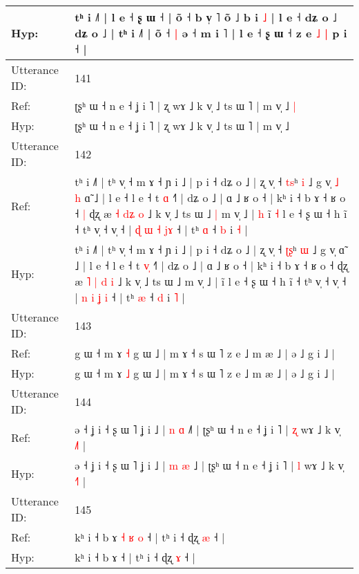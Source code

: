 \documentclass[10pt]{article}
\DeclareRobustCommand{\hl}[1]{{\textcolor{red}{#1}}}
\begin{document}
\begin{longtable}{ll}
 \\
Hyp: & tʰ i ˩˥ | l e ˧ ʂ ɯ\hl{}\hl{}\hl{}\hl{}\hl{}\hl{}\hl{} ˧ | õ ˧ b v̩ ˥ õ ˩\hl{}\hl{} b i \hl{˩} |\hl{}\hl{}\hl{}\hl{}\hl{} l e ˧ dʑ o\hl{}\hl{}\hl{}\hl{}\hl{}\hl{}\hl{} ˩ dʑ o ˩ | tʰ i ˩˥ | õ ˧\hl{ }\hl{|} ə ˧ m i ˥ | l e ˧ ʂ ɯ ˧ z e\hl{ }\hl{˩} \hl{|} p i ˧ |
 \\
\midrule
Utterance ID: & 141 \\
Ref: & ʈʂʰ ɯ ˧ n e ˧ ʝ i ˥ | ʐ wɤ ˩ k v̩ ˩ ts ɯ ˥ | m v̩ ˩\hl{ }\hl{|}
 \\
Hyp: & ʈʂʰ ɯ ˧ n e ˧ ʝ i ˥ | ʐ wɤ ˩ k v̩ ˩ ts ɯ ˥ | m v̩ ˩\hl{}\hl{}
 \\
\midrule
Utterance ID: & 142 \\
Ref: & tʰ i ˩˥ | tʰ v̩ ˧ m ɤ ˧ ɲ i ˩ | p i ˧ dʑ o ˩ | ʐ v̩ ˧ \hl{t}\hl{s}ʰ \hl{i} ˩ g v̩\hl{ }\hl{˩}\hl{ }\hl{h} ɑ̃ ˩ | l e ˧ l e ˧ t \hl{}\hl{ɑ} ˧˥ | dʑ o ˩ | ɑ ˩ ʁ o ˧ | kʰ i ˧ b ɤ ˧ ʁ o ˧\hl{ }\hl{|} ɖʐ æ \hl{˧} \hl{}\hl{d}\hl{ʑ} \hl{o} ˩ k v̩ ˩ ts ɯ ˩\hl{ }\hl{|} m v̩ ˩ |\hl{ }\hl{h} ĩ\hl{ }\hl{˧} l e ˧ ʂ ɯ ˧ h ĩ ˧ tʰ v̩ ˧ v̩ ˧ | \hl{ɖ} \hl{ɯ} \hl{˧} \hl{j}\hl{ɤ} ˧ | tʰ \hl{ɑ} ˧ \hl{b} i \hl{˧} |
 \\
Hyp: & tʰ i ˩˥ | tʰ v̩ ˧ m ɤ ˧ ɲ i ˩ | p i ˧ dʑ o ˩ | ʐ v̩ ˧ \hl{ʈ}\hl{ʂ}ʰ \hl{ɯ} ˩ g v̩\hl{}\hl{}\hl{}\hl{} ɑ̃ ˩ | l e ˧ l e ˧ t \hl{v}\hl{̩} ˧˥ | dʑ o ˩ | ɑ ˩ ʁ o ˧ | kʰ i ˧ b ɤ ˧ ʁ o ˧\hl{}\hl{} ɖʐ æ \hl{˥} \hl{|}\hl{ }\hl{d} \hl{i} ˩ k v̩ ˩ ts ɯ ˩\hl{}\hl{} m v̩ ˩ |\hl{}\hl{} ĩ\hl{}\hl{} l e ˧ ʂ ɯ ˧ h ĩ ˧ tʰ v̩ ˧ v̩ ˧ | \hl{n} \hl{i} \hl{ʝ} \hl{}\hl{i} ˧ | tʰ \hl{æ} ˧ \hl{d} i \hl{˥} |
 \\
\midrule
Utterance ID: & 143 \\
Ref: & g ɯ ˧ m ɤ \hl{˧} g ɯ ˩ | m ɤ ˧ s ɯ ˥ z e ˩ m æ ˩ | ə ˩ g i ˩ |
 \\
Hyp: & g ɯ ˧ m ɤ \hl{˩} g ɯ ˩ | m ɤ ˧ s ɯ ˥ z e ˩ m æ ˩ | ə ˩ g i ˩ |
 \\
\midrule
Utterance ID: & 144 \\
Ref: & ə ˧ ʝ i ˧ ʂ ɯ ˥ ʝ i ˩ | \hl{n} \hl{ɑ} ˩\hl{˥} | ʈʂʰ ɯ ˧ n e ˧ ʝ i ˥ | \hl{ʐ} wɤ ˩ k v̩ \hl{˩}˥ |
 \\
Hyp: & ə ˧ ʝ i ˧ ʂ ɯ ˥ ʝ i ˩ | \hl{m} \hl{æ} ˩\hl{} | ʈʂʰ ɯ ˧ n e ˧ ʝ i ˥ | \hl{l} wɤ ˩ k v̩ \hl{˧}˥ |
 \\
\midrule
Utterance ID: & 145 \\
Ref: & kʰ i ˧ b ɤ\hl{ }\hl{˧}\hl{ }\hl{ʁ}\hl{ }\hl{o} ˧ | tʰ i ˧ ɖʐ \hl{æ} ˧ |
 \\
Hyp: & kʰ i ˧ b ɤ\hl{}\hl{}\hl{}\hl{}\hl{}\hl{} ˧ | tʰ i ˧ ɖʐ \hl{ɤ} ˧ |
 \\
\midrule

\end{longtable}
\end{document}
